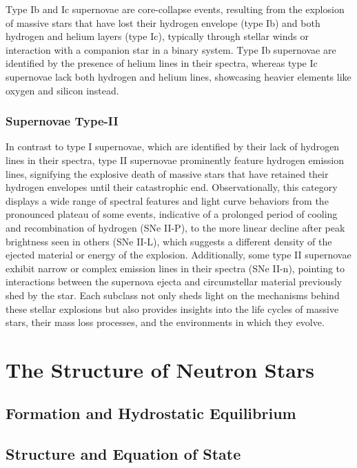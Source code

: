 \documentclass[main.tex]{subfiles}
\begin{document}
    Type Ib and Ic supernovae are core-collapse events, resulting from the explosion of massive stars that have lost their hydrogen envelope (type Ib) and both hydrogen and helium layers (type Ic), typically through stellar winds or interaction with a companion star in a binary system. Type Ib supernovae are identified by the presence of helium lines in their spectra, whereas type Ic supernovae lack both hydrogen and helium lines, showcasing heavier elements like oxygen and silicon instead.
    \subsubsection{Supernovae Type-II}
    In contrast to type I supernovae, which are identified by their lack of hydrogen lines in their spectra, type II supernovae prominently feature hydrogen emission lines, signifying the explosive death of massive stars that have retained their hydrogen envelopes until their catastrophic end. Observationally, this category displays a wide range of spectral features and light curve behaviors from the pronounced plateau of some events, indicative of a prolonged period of cooling and recombination of hydrogen (SNe II-P), to the more linear decline after peak brightness seen in others (SNe II-L), which suggests a different density of the ejected material or energy of the explosion. Additionally, some type II supernovae exhibit narrow or complex emission lines in their spectra (SNe II-n), pointing to interactions between the supernova ejecta and circumstellar material previously shed by the star.  Each subclass not only sheds light on the mechanisms behind these stellar explosions but also provides insights into the life cycles of massive stars, their mass loss processes, and the environments in which they evolve.


    \section{The Structure of Neutron Stars}\label{sec:ch1:ns_struct}

    \subsection{Formation and Hydrostatic Equilibrium}

    \subsection{Structure and Equation of State}
\end{document}
